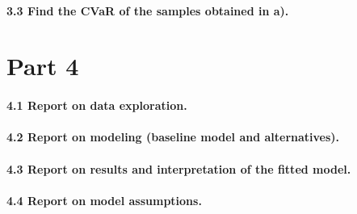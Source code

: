 \documentclass[]{article}
\let\oldparagraph\paragraph
\renewcommand{\paragraph}[1]{\oldparagraph{#1}\mbox{}}
\begin{document}
\hypertarget{find-the-cvar-of-the-samples-obtained-in-a.}{%
\paragraph{\texorpdfstring{\textbf{3.3 Find the CVaR of the samples
obtained in a).
}}{3.3 Find the CVaR of the samples obtained in a). }}\label{find-the-cvar-of-the-samples-obtained-in-a.}}

\hypertarget{part-4}{%
\section{Part 4}\label{part-4}}

\hypertarget{report-on-data-exploration.}{%
\paragraph{\texorpdfstring{\textbf{4.1 Report on data
exploration.}}{4.1 Report on data exploration.}}\label{report-on-data-exploration.}}

\hypertarget{report-on-modeling-baseline-model-and-alternatives.}{%
\paragraph{\texorpdfstring{\textbf{4.2 Report on modeling (baseline
model and
alternatives).}}{4.2 Report on modeling (baseline model and alternatives).}}\label{report-on-modeling-baseline-model-and-alternatives.}}

\hypertarget{report-on-results-and-interpretation-of-the-fitted-model.}{%
\paragraph{\texorpdfstring{\textbf{4.3 Report on results and
interpretation of the fitted
model.}}{4.3 Report on results and interpretation of the fitted model.}}\label{report-on-results-and-interpretation-of-the-fitted-model.}}

\hypertarget{report-on-model-assumptions.}{%
\paragraph{\texorpdfstring{\textbf{4.4 Report on model
assumptions.}}{4.4 Report on model assumptions.}}\label{report-on-model-assumptions.}}
\end{document}
